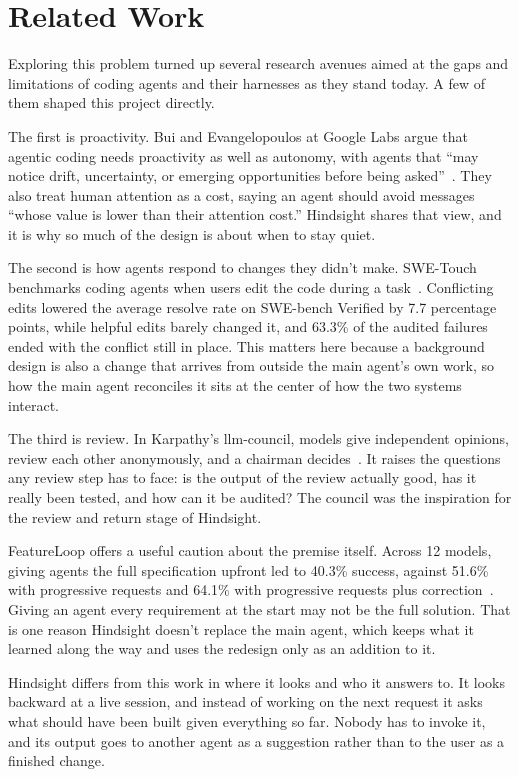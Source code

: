 \section{Related Work}
\label{sec:related}

Exploring this problem turned up several research avenues aimed at the gaps and limitations of coding agents and their harnesses as they stand today. A few of them shaped this project directly.

The first is proactivity. Bui and Evangelopoulos at Google Labs argue that agentic coding needs proactivity as well as autonomy, with agents that ``may notice drift, uncertainty, or emerging opportunities before being asked''~\cite{bui2026proactivity}. They also treat human attention as a cost, saying an agent should avoid messages ``whose value is lower than their attention cost.'' Hindsight shares that view, and it is why so much of the design is about when to stay quiet.

The second is how agents respond to changes they didn't make. SWE-Touch benchmarks coding agents when users edit the code during a task~\cite{tan2026swetouch}. Conflicting edits lowered the average resolve rate on SWE-bench Verified by 7.7 percentage points, while helpful edits barely changed it, and 63.3\% of the audited failures ended with the conflict still in place. This matters here because a background design is also a change that arrives from outside the main agent's own work, so how the main agent reconciles it sits at the center of how the two systems interact.

The third is review. In Karpathy's llm-council, models give independent opinions, review each other anonymously, and a chairman decides~\cite{karpathy2025council}. It raises the questions any review step has to face: is the output of the review actually good, has it really been tested, and how can it be audited? The council was the inspiration for the review and return stage of Hindsight.

FeatureLoop offers a useful caution about the premise itself. Across 12 models, giving agents the full specification upfront led to 40.3\% success, against 51.6\% with progressive requests and 64.1\% with progressive requests plus correction~\cite{feng2026featureloop}. Giving an agent every requirement at the start may not be the full solution. That is one reason Hindsight doesn't replace the main agent, which keeps what it learned along the way and uses the redesign only as an addition to it.

Hindsight differs from this work in where it looks and who it answers to. It looks backward at a live session, and instead of working on the next request it asks what should have been built given everything so far. Nobody has to invoke it, and its output goes to another agent as a suggestion rather than to the user as a finished change.

